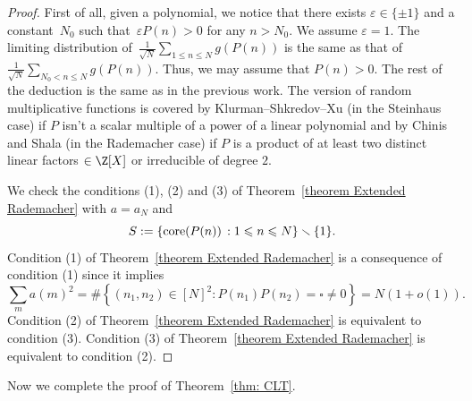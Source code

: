 \documentclass[reqno, 12pt]{amsart}
\theoremstyle{plain}
\theoremstyle{definition}
\theoremstyle{remark}
\renewcommand{\le}{\leqslant}
\newcommand{\co}{\textnormal{core}}
\begin{document}
 
\begin{proof}First of all, 
given a polynomial, we notice that there exists $\varepsilon\in \{ \pm1\}$ and a constant~$N_0$ such that~$\varepsilon P(n)>0$ for any $n>N_0$. We assume $\varepsilon=1$. The limiting distribution of~$\frac{1}{\sqrt{N}}\sum_{1\le n \le  N}g(P(n))$ is the same as that of~$\frac{1}{\sqrt{N}}\sum_{N_0< n \le N}g(P(n))$. Thus, we may assume that $P(n)> 0$. The rest of the deduction is the same as in the previous work. The version of random multiplicative functions is covered by Klurman--Shkredov--Xu \cite[Theorem 1.1]{KSX23} (in the Steinhaus case) if $P$ isn't a scalar multiple of a power of a linear polynomial and by Chinis and Shala \cite[Theorem 1.2]{CS25}  (in the Rademacher case) if $P$ is a product of at least two distinct linear factors $\in \Z[X]$ or irreducible of degree $2$. 

We check the conditions (1), (2) and (3) of Theorem~\ref{theorem Extended Rademacher}
with $a=a_N$ and
$$S:=\{ \co(P(n))\,: 1\le n\le N\} \smallsetminus \{1\}.$$
Condition (1) of Theorem~\ref{theorem Extended Rademacher}  is a consequence of
condition  (1)  since it implies
$$\sum_ma(m)^2=\#\left\{( n_1, n_2 )\in [N]^{2}:  P(n_1)P(n_2)  = \square \neq 0  \right\} =N(1+o(1)).$$  Condition (2) of Theorem~\ref{theorem Extended Rademacher}  is equivalent to 
condition  (3). Condition (3) of Theorem~\ref{theorem Extended Rademacher}  is equivalent to 
condition  (2).
\end{proof}

Now we complete the proof of Theorem~\ref{thm: CLT}.
\end{document}
